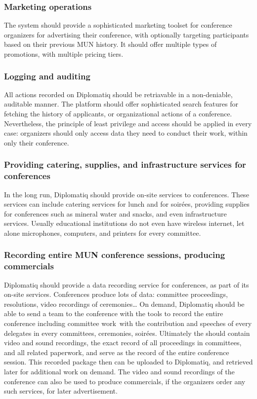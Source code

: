 \subsubsection{Marketing operations}

The system should provide a sophisticated marketing toolset for conference organizers for advertising their conference, with optionally targeting participants based on their previous MUN history. It should offer multiple types of promotions, with multiple pricing tiers.

\subsubsection{Logging and auditing}

All actions recorded on Diplomatiq should be retriavable in a non-deniable, auditable manner. The platform should offer sophisticated search features for fetching the history of applicants, or organizational actions of a conference. Nevertheless, the principle of least privilege and access should be applied in every case: organizers should only access data they need to conduct their work, within only their conference.

\subsubsection{Providing catering, supplies, and infrastructure services for conferences}

In the long run, Diplomatiq should provide on-site services to conferences. These services can include catering services for lunch and for soirées, providing supplies for conferences such as mineral water and snacks, and even infrastructure services. Usually educational institutions do not even have wireless internet, let alone microphones, computers, and printers for every committee.

\subsubsection{Recording entire MUN conference sessions, producing commercials}

Diplomatiq should provide a data recording service for conferences, as part of its on-site services. Conferences produce lots of data: committee proceedings, resolutions, video recordings of ceremonies… On demand, Diplomatiq should be able to send a team to the conference with the tools to record the entire conference including committee work with the contribution and speeches of every delegates in every committees, ceremonies, soirées. Ultimately the  should contain video and sound recordings, the exact record of all proceedings in committees, and all related paperwork, and serve as the record of the entire conference session. This recorded package then can be uploaded to Diplomatiq, and retrieved later for additional work on demand. The video and sound recordings of the conference can also be used to produce commercials, if the organizers order any such services, for later advertisement.

